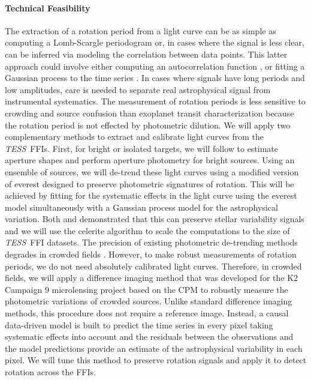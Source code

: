\documentclass[letterpaper,12pt,preprint]{hack_aastex}
\newcommand{\TESS}{{\it TESS}}
\newcommand{\eg}{{\it e.g.}}
\begin{document}
\paragraph{Technical Feasibility}
The extraction of a rotation period from a light curve can be as simple as
computing a Lomb-Scargle periodogram or, in cases where the signal is less
clear, can be inferred via modeling the correlation between data points.
This latter approach could involve either computing an autocorrelation
function \citep[\eg][]{mcquillan2013}, or fitting a Gaussian process to the
time series \citep{angus2017, foreman-mackey2017}.
In cases where signals have long periods and low amplitudes, care is needed to
separate real astrophysical signal from instrumental systematics.
The measurement of rotation periods is less sensitive to crowding and source
confusion than exoplanet transit characterization because the rotation period
is not effected by photometric dilution.
We will apply two complementary methods to extract and calibrate light curves
from the \TESS\ FFIs.
First, for bright or isolated targets, we will follow \citet{montet2017} to
estimate aperture shapes and perform aperture photometry for bright sources.
Using an ensemble of sources, we will de-trend these light curves using a
modified version of \textsf{everest} \citep{luger2016, luger2017} designed to
preserve photometric signatures of rotation.
This will be achieved by fitting for the systematic effects in the light curve
using the \textsf{everest} model simultaneously with a Gaussian process model
for the astrophysical variation.
Both \citet{aigrain2016} and \citet{luger2016} demonstrated that this can
preserve stellar variability signals and we will use the \textsf{celerite}
algorithm \citep{foreman-mackey2017} to scale the computations to the size of
\TESS\ FFI datasets.
The precision of existing photometric de-trending methods degrades in crowded
fields \citep[for example,][]{luger2017}.
However, to make robust measurements of rotation periods, we do not need
absolutely calibrated light curves.
Therefore, in crowded fields, we will apply a difference imaging method that
was developed for the K2 Campaign 9 microlensing project \citep{henderson2016}
based on the \textsf{CPM} \citep{wang2016} to robustly measure the photometric
variations of crowded sources.
Unlike standard difference imaging methods, this procedure does not require a
reference image.
Instead, a causal data-driven model is built to predict the time series in
every pixel taking systematic effects into account and the residuals between
the observations and the model predictions provide an estimate of the
astrophysical variability in each pixel.
We will tune this method to preserve rotation signals and apply it to detect
rotation across the FFIs.
\end{document}
